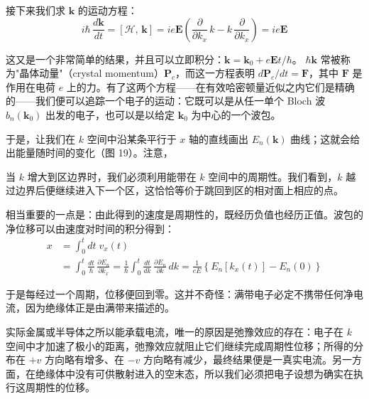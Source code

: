 接下来我们求 $\mathbf{k}$ 的运动方程：
\begin{equation*}
i\hbar\,\frac{d\mathbf{k}}{dt} = [\mathcal{H},\,\mathbf{k}] = ie\mathbf{E}\left(\frac{\partial}{\partial k_x}\,k - k\,\frac{\partial}{\partial k_x}\right) = ie\mathbf{E}
\end{equation*}


这又是一个非常简单的结果，并且可以立即积分：$\mathbf{k} = \mathbf{k}_0 + e\mathbf{E}t/\hbar$。
$\hbar\mathbf{k}$ 常被称为"晶体动量"（crystal momentum）$\mathbf{P}_c$，而这一方程表明 $d\mathbf{P}_c/dt = \mathbf{F}$，其中 $\mathbf{F}$ 是作用在电荷 $e$ 上的力。有了这两个方程——在有效哈密顿量近似之内它们是精确的——我们便可以追踪一个电子的运动：它既可以是从任一单个 Bloch 波 $b_n(\mathbf{k}_0)$ 出发的电子，也可以是以给定 $\mathbf{k}_0$ 为中心的一个波包。

于是，让我们在 $k$ 空间中沿某条平行于 $x$ 轴的直线画出 $E_n(\mathbf{k})$ 曲线；这就会给出能量随时间的变化（图 19）。注意，



当 $k$ 增大到区边界时，我们必须利用能带在 $k$ 空间中的周期性。我们看到，$k$ 越过边界后便继续进入下一个区，这恰恰等价于跳回到区的相对面上相应的点。

相当重要的一点是：由此得到的速度是周期性的，既经历负值也经历正值。波包的净位移可以由速度对时间的积分得到：
\begin{align*}
x &= \int_0^t dt\; v_x(t) \\
&= \int_0^t \frac{dt}{\hbar}\,\frac{\partial E_n}{\partial k_x} = \frac{1}{\hbar}\int_0^t \frac{dt}{dk}\,\frac{\partial E_n}{\partial k}\,dk = \frac{1}{eE}\left\{E_n[k_x(t)] - E_n(0)\right\}
\end{align*}

于是每经过一个周期，位移便回到零。这并不奇怪：满带电子必定不携带任何净电流，因为绝缘体正是由满带来描述的。

实际金属或半导体之所以能承载电流，唯一的原因是弛豫效应的存在：电子在 $k$ 空间中才加速了极小的距离，弛豫效应就阻止它们继续完成周期性位移；所得的分布在 $+v$ 方向略有增多、在 $-v$ 方向略有减少，最终结果便是一真实电流。另一方面，在绝缘体中没有可供散射进入的空末态，所以我们必须把电子设想为确实在执行这周期性的位移。

